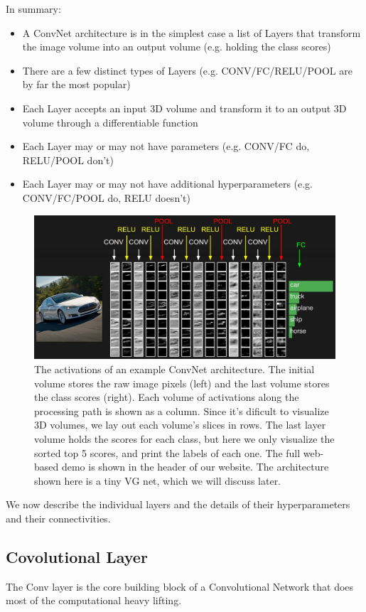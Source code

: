 \documentclass[fleqn,10pt]{olplainarticle}
\theoremstyle{definition}
\theoremstyle{remark}
\begin{document}
In summary:
\begin{itemize}
\item A ConvNet architecture is in the simplest case a list of Layers that transform the image volume into an output volume (e.g. holding the class scores)
\item There are a few distinct types of Layers (e.g. CONV/FC/RELU/POOL are by far the most popular)
\item Each Layer accepts an input 3D volume and transform it to an output 3D volume through a differentiable function
\item Each Layer may or may not have parameters (e.g. CONV/FC do, RELU/POOL don't)
\item Each Layer may or may not have additional hyperparameters (e.g. CONV/FC/POOL do, RELU doesn't)
\end{itemize}

\begin{figure}[ht]
\centering
\includegraphics[width=1.0\linewidth]{images/convnet}
\caption{The activations of an example ConvNet architecture. The initial volume stores the raw image pixels (left) and the last volume stores the class scores (right). Each volume of activations along the processing path is shown as a column. Since it's dificult to visualize 3D volumes, we lay out each volume's slices in rows. The last layer volume holds the scores for each class, but here we only visualize the sorted top 5 scores, and print the labels of each one. The full web-based demo is shown in the header of our website. The architecture shown here is a tiny VG net, which we will discuss later.}
\label{fig:Example ConvNet architecture}
\end{figure}

We now describe the individual layers and the details of their hyperparameters and their connectivities.

\subsection*{Covolutional Layer}
The Conv layer is the core building block of a Convolutional Network that does most of the computational heavy lifting.\medskip
\end{document}
